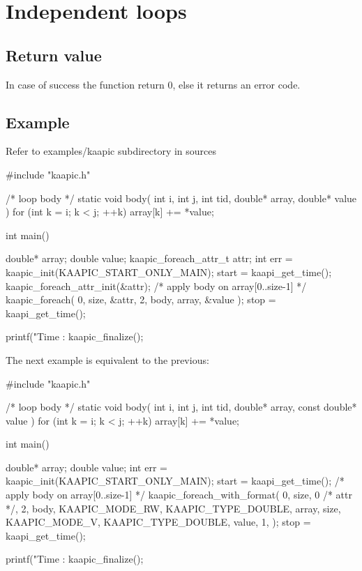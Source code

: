 \documentclass[a4paper, 11pt]{article}
\makeatletter
\newenvironment{apisection}[2][noshortnameprovided]{%
  \newpage
  \section{#2}
  \label{api@#1}
  \newcommand{\api@newpart}[4][noshortpartnameprovided]{%
    \newenvironment{##1}{%
      \subsection{##2}%
      \label{api@#1@##1}%
      ##3%
    }{##4}%
  }%
  \api@newpart[synopsis]{Synopsis}{}{}%
  \api@newpart[call]{Call}{}{}%
  \api@newpart[desc]{Description}{}{}%
  \api@newpart[params]{Parameters}{%
    \let\api@indesc\@empty
    \newcommand{\param}[1]{%
      \def\api@indesc{yes}%
      \begin{description}%
        \renewcommand{\param}[1]{\item[########1]}%
      \item[####1]
      }%
      \newenvironment{parameters}{%
        \begin{description}%
          \renewcommand{\param}[1]{\item[########1]}%
        }{%
        \end{description}%
      }
    }{%
      \ifx\api@indesc\@empty\relax\else%
    \end{description}%
    \fi%
  }%
  \api@newpart[ret]{Return value}{%
    \newcommand{\otherret}{\par\medskip\noindent}%
  }{}%
  \api@newpart[example]{Example}{}{}%
}{}
\makeatother
\begin{document}
\begin{apisection}[loop]{Independent loops}
  \begin{ret}
    In case of success the function return 0, else it returns an error
    code.
  \end{ret}
  \begin{example}
    Refer to examples/kaapic subdirectory in sources\\

    \begin{code}
  #include "kaapic.h"

  /* loop body */
  static void body(
    int i, int j, int tid, double* array, double* value
  ) 
  {
    for (int k = i; k < j; ++k)
      array[k] += *value;
  }

  int main()
  {
    double* array;
    double value;
    kaapic_foreach_attr_t attr;
    int err = kaapic_init(KAAPIC_START_ONLY_MAIN);
    start = kaapi_get_time(); 
    kaapic_foreach_attr_init(&attr);
    /* apply body on array[0..size-1] */
    kaapic_foreach( 0, size, &attr, 2, body, array, &value );
    stop = kaapi_get_time(); 

    printf("Time : %
    kaapic_finalize();
  }
    \end{code}

    The next example is equivalent to the previous:
    \begin{code}
  #include "kaapic.h"

  /* loop body */
  static void body(
    int i, int j, int tid, double* array, const double* value
  ) 
  {
    for (int k = i; k < j; ++k)
      array[k] += *value;
  }

  int main()
  {
    double* array;
    double value;
    int err = kaapic_init(KAAPIC_START_ONLY_MAIN);
    start = kaapi_get_time(); 
    /* apply body on array[0..size-1] */
    kaapic_foreach_with_format( 0, size, 0 /* attr */, 2, body, 
        KAAPIC_MODE_RW, KAAPIC_TYPE_DOUBLE, array, size, 
        KAAPIC_MODE_V, KAAPIC_TYPE_DOUBLE, value, 1,  
    );
    stop = kaapi_get_time(); 

    printf("Time : %
    kaapic_finalize();
  }
    \end{code}
  \end{example}
\end{apisection}
\end{document}
